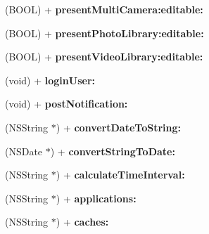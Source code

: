 \begin{DoxyCompactItemize}
\item 
\hypertarget{interface_e_s_utility_ab6c42509e998aa38203dcb7f08bcd0ed}{}(B\+O\+O\+L) + {\bfseries present\+Multi\+Camera\+:editable\+:}\label{interface_e_s_utility_ab6c42509e998aa38203dcb7f08bcd0ed}

\item 
\hypertarget{interface_e_s_utility_ad94490bcb28f2b0ac44053010dd056fa}{}(B\+O\+O\+L) + {\bfseries present\+Photo\+Library\+:editable\+:}\label{interface_e_s_utility_ad94490bcb28f2b0ac44053010dd056fa}

\item 
\hypertarget{interface_e_s_utility_a67f2f0a2df1dd471687ac8ebe2ba89fc}{}(B\+O\+O\+L) + {\bfseries present\+Video\+Library\+:editable\+:}\label{interface_e_s_utility_a67f2f0a2df1dd471687ac8ebe2ba89fc}

\item 
\hypertarget{interface_e_s_utility_a99c4328bbbebcc110ec5126be12a6ccb}{}(void) + {\bfseries login\+User\+:}\label{interface_e_s_utility_a99c4328bbbebcc110ec5126be12a6ccb}

\item 
\hypertarget{interface_e_s_utility_a4e5b41bdd43d4472f438e8fe90688968}{}(void) + {\bfseries post\+Notification\+:}\label{interface_e_s_utility_a4e5b41bdd43d4472f438e8fe90688968}

\item 
\hypertarget{interface_e_s_utility_a65dfe9385c2a05b58e1dbc2351d4047e}{}(N\+S\+String $\ast$) + {\bfseries convert\+Date\+To\+String\+:}\label{interface_e_s_utility_a65dfe9385c2a05b58e1dbc2351d4047e}

\item 
\hypertarget{interface_e_s_utility_a857bf698280069106ee90f1d81def971}{}(N\+S\+Date $\ast$) + {\bfseries convert\+String\+To\+Date\+:}\label{interface_e_s_utility_a857bf698280069106ee90f1d81def971}

\item 
\hypertarget{interface_e_s_utility_ac3496acaa99963241717e4c4938f95ac}{}(N\+S\+String $\ast$) + {\bfseries calculate\+Time\+Interval\+:}\label{interface_e_s_utility_ac3496acaa99963241717e4c4938f95ac}

\item 
\hypertarget{interface_e_s_utility_a067ed1fc54645d2fb40c973fcb6a05c8}{}(N\+S\+String $\ast$) + {\bfseries applications\+:}\label{interface_e_s_utility_a067ed1fc54645d2fb40c973fcb6a05c8}

\item 
\hypertarget{interface_e_s_utility_ad5d3c25ebc63958630ea49936cd342d2}{}(N\+S\+String $\ast$) + {\bfseries caches\+:}\label{interface_e_s_utility_ad5d3c25ebc63958630ea49936cd342d2}


\end{DoxyCompactItemize}
